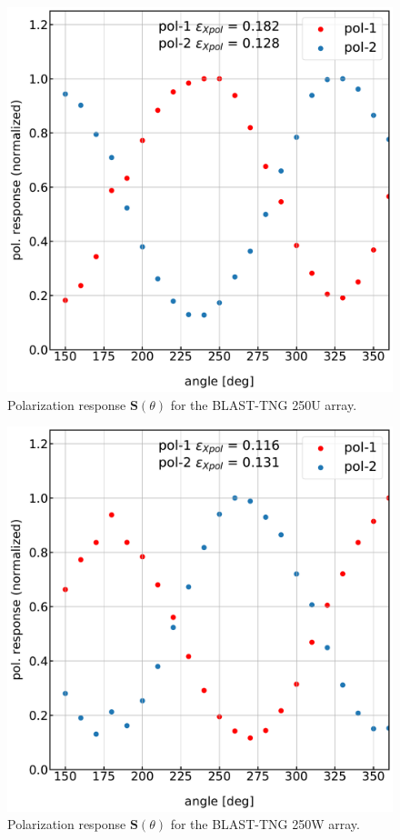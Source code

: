 \begin{figure}[!htbp]
\centering
\includegraphics[width=\textwidth]{figures/blast_data/polarization/250U_poleff}
\caption{Polarization response $\mathbf{S}(\theta)$ for the BLAST-TNG 250U array.}
\label{fig:250U pol}
\end{figure}

\begin{figure}[!htbp]
\centering
\includegraphics[width=\textwidth]{figures/blast_data/polarization/250W_poleff}
\caption{Polarization response $\mathbf{S}(\theta)$ for the BLAST-TNG 250W array.}
\label{fig:250W pol}
\end{figure}

